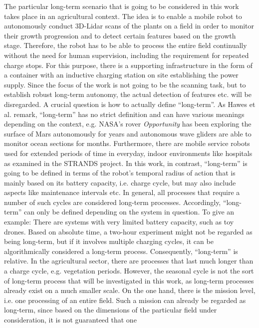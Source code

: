 \documentclass[english, master, expose, utf8]{base/thesis_KBS}
\begin{document}
The particular long-term scenario that is going to be considered in this work takes place in an agricultural context.
The idea is to enable a mobile robot to autonomously conduct 3D-Lidar scans of the plants on a field in order to monitor their growth progression and 
to detect certain features based on the growth stage. Therefore, the robot has to be able to process the entire field continually without the need for human supervision,
including the requirement for repeated charge stops. For this purpose, there is a supporting infrastructure in the form of a container with an inductive charging station on site
establishing the power supply. Since the focus of the work is not going to be the scanning task, but to establish robust long-term autonomy, the actual detection of features 
etc. will be disregarded.
A crucial question is how to actually define ``long-term''. As Hawes et al. remark, ``long-term'' has no strict definition and can have various meanings depending
on the context, e.g. NASA's rover \textit{Opportunity} has been exploring the surface of Mars autonomously for years and autonomous wave gliders are able to monitor
ocean sections for months. Furthermore, there are mobile service robots used for extended periods of time in everyday, indoor environments like hospitals 
as examined in the STRANDS project. \cite{Hawes:2017}
In this work, in contrast, ``long-term'' is going to be defined in terms of the robot's temporal radius of action that is mainly based on its battery capacity, i.e. charge cycle,
but may also include aspects like maintenance intervals etc. In general, all processes that require a number of such cycles are considered long-term processes.
Accordingly, ``long-term'' can only be defined depending on the system in question. To give an example: There are systems with very limited battery capacity, 
such as toy drones. Based on absolute time, a two-hour experiment might not be regarded as being long-term, but if it involves multiple charging cycles, it can be 
algorithmically considered a long-term process. Consequently, ``long-term'' is relative.\newline
In the agricultural sector, there are processes that last much longer than a charge cycle, e.g. vegetation periods.
However, the seasonal cycle is not the sort of long-term process that will be investigated in this work, as long-term processes already exist on a much smaller scale.
On the one hand, there is the mission level, i.e. one processing of an entire field. 
Such a mission can already be regarded as long-term, since based on the dimensions of the particular field under consideration, it is not guaranteed that one
\end{document}
